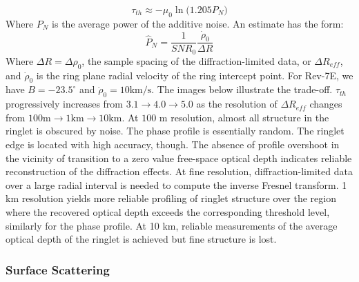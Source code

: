 \documentclass{article}
\begin{document}
            \begin{equation}
            \tau_{th} \approx -\mu_0\ln\big(1.205 P_N\big)
            \end{equation}
            Where $P_N$ is the average power of the additive noise. An estimate has the form:
            \begin{equation}
            \hat{P}_N = \frac{1}{SNR_0}\frac{\dot{\rho}_0}{\Delta R}
            \end{equation}
            Where $\Delta R = \Delta \rho_0$, the sample spacing of the diffraction-limited data, or $\Delta R_{eff}$, and $\dot{\rho}_0$ is the ring plane radial velocity of the ring intercept point. For Rev-7E, we have $B = -23.5^{\circ}$ and $\dot{\rho}_0 = 10 \textrm{km/s}$. The images below illustrate the trade-off. $\tau_{th}$ progressively increases from $3.1\rightarrow 4.0 \rightarrow 5.0$ as the resolution of $\Delta R_{eff}$ changes from $100\textrm{m}\rightarrow 1\textrm{km}\rightarrow 10\textrm{km}$. At $100$ m resolution, almost all structure in the ringlet is obscured by noise. The phase profile is essentially random. The ringlet edge is located with high accuracy, though. The absence of profile overshoot in the vicinity of transition to a zero value free-space optical depth indicates reliable reconstruction of the diffraction effects. At fine resolution, diffraction-limited data over a large radial interval is needed to compute the inverse Fresnel transform. 1 km resolution yields more reliable profiling of ringlet structure over the region where the recovered optical depth exceeds the corresponding threshold level, similarly for the phase profile. At 10 km, reliable measurements of the average optical depth of the ringlet is achieved but fine structure is lost. 
            
            \subsubsection{Surface Scattering}
            
\end{document}
